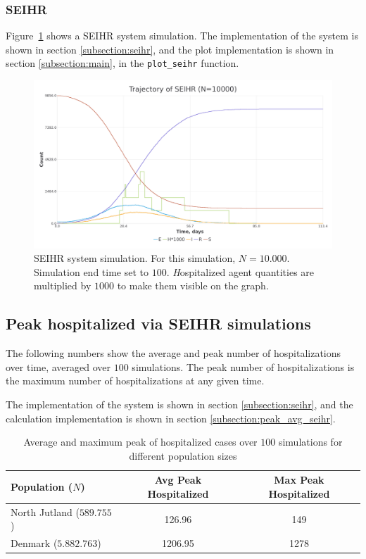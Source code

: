 \subsubsection{SEIHR}
Figure~\ref{fig:seihr_sim} shows a SEIHR system simulation.
The implementation of the system is shown in section \ref{subsection:seihr}, and the plot implementation is shown in section \ref{subsection:main}, in the \texttt{plot\_seihr} function.

\begin{figure}[H]
\centering
\includegraphics[width=1\textwidth,height=\textheight,keepaspectratio]{images/seihr.png}
\caption{SEIHR system simulation. For this simulation, $N=10.000$. Simulation end time set to $100$. \textit{H}ospitalized agent quantities are multiplied by $1000$ to make them visible on the graph.}
\label{fig:seihr_sim}
\end{figure}

\subsection{Peak hospitalized via SEIHR simulations}
The following numbers show the average and peak number of hospitalizations over time, averaged over $100$ simulations.
The peak number of hospitalizations is the maximum number of hospitalizations at any given time.

The implementation of the system is shown in section \ref{subsection:seihr}, and the calculation implementation is shown in section \ref{subsection:peak_avg_seihr}.

\begin{table}[ht]
\centering
\begin{tabular}{|l|c|c|}
\hline
\textbf{Population ($N$)} & \textbf{Avg Peak Hospitalized} & \textbf{Max Peak Hospitalized} \\
\hline
North Jutland ($589.755$) & 126.96 & 149 \\
\hline
Denmark ($5.882.763$) & 1206.95 & 1278 \\
\hline
\end{tabular}
\caption{Average and maximum peak of hospitalized cases over $100$ simulations for different population sizes}
\end{table}

